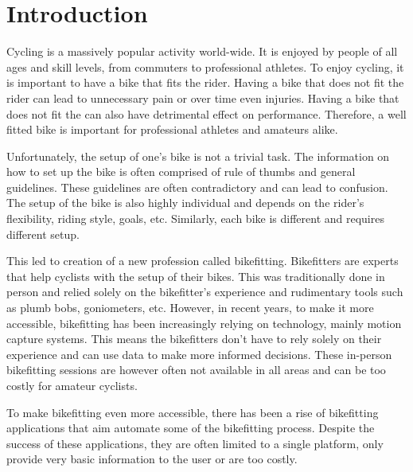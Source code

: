 
% 

\chapter{Introduction}
Cycling is a massively popular activity world-wide. It is enjoyed by people of all ages and skill levels, from commuters to professional athletes. To enjoy cycling, it is important to have a bike that fits the rider. Having a bike that does not fit the rider can lead to unnecessary pain or over time even injuries. Having a bike that does not fit the can also have detrimental effect on performance. Therefore, a well fitted bike is important for professional athletes and amateurs alike.

Unfortunately, the setup of one's bike is not a trivial task. The information on how to set up the bike is often comprised of rule of thumbs and general guidelines. These guidelines are often contradictory and can lead to confusion. The setup of the bike is also highly individual and depends on the rider's flexibility, riding style, goals, etc. Similarly, each bike is different and requires different setup.

This led to creation of a new profession called bikefitting. Bikefitters are experts that help cyclists with the setup of their bikes. This was traditionally done in person and relied solely on the bikefitter's experience and rudimentary tools such as plumb bobs, goniometers, etc. However, in recent years, to make it more accessible, bikefitting has been increasingly relying on technology, mainly motion capture systems. This means the bikefitters don't have to rely solely on their experience and can use data to make more informed decisions. These in-person bikefitting sessions are however often not available in all areas and can be too costly for amateur cyclists.

To make bikefitting even more accessible, there has been a rise of bikefitting applications that aim automate some of the bikefitting process. Despite the success of these applications, they are often limited to a single platform, only provide very basic information to the user or are too costly.

